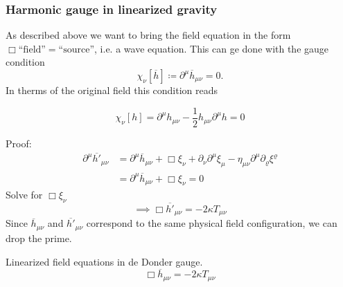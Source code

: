 \subsubsection{Harmonic gauge in linearized gravity}
As described above we want to bring the field equation in the form
$\Box\text{``field''}=\text{``source''}$, i.e. a wave equation.
This can ge done with the gauge condition
\begin{equation}
    \chi_\nu \left[ \overline{h} \right] \coloneqq \partial^\mu \overline{h}_{\mu\nu} = 0.
\end{equation}
In therms of the original field this condition reads
\begin{definition}
    \begin{equation}
        \chi_\nu \left[ h \right] = \partial^\mu h_{\mu\nu} - \frac{1}{2} h_{\mu\nu} \partial^\mu h = 0
    \end{equation}
\end{definition}
Proof: %
\begin{equation}
    \begin{split}
        \partial^\mu \overline{h'}_{\mu\nu} &= \partial^\mu \overline{h}_{\mu\nu} + \Box \xi_\nu + \partial_\nu \partial^\mu \xi_\mu -
        \eta_{\mu\nu} \partial^\mu\partial_\varrho\xi^\varrho \\
        &= \partial^\mu \overline{h}_{\mu\nu} + \Box \xi_\nu = 0
    \end{split}
\end{equation}
Solve for $\Box\xi_\nu$
\begin{equation}
    \implies \Box \overline{h'}_{\mu\nu} = -2\kappa T_{\mu\nu}
\end{equation}
Since $\overline{h}_{\mu\nu}$ and $\overline{h'}_{\mu\nu}$ correspond to the same physical field configuration, we can drop the prime.
\begin{definition}{Linearized field equations in de Donder gauge.}
    \begin{equation}
        \Box \overline{h}_{\mu\nu} = - 2 \kappa T_{\mu\nu}
\end{equation}
\end{definition}
